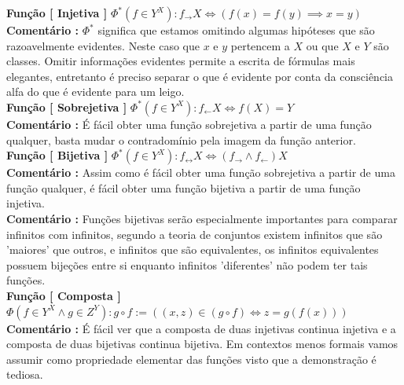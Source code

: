 \documentclass[10pt,a4paper]{report}
\begin{document}

\textbf{Função [ Injetiva ]} $ \Phi^*( f \in Y^X ) : f_{\rightarrow} X \iff ( f(x) = f(y) \implies x = y ) $\\

\textbf{Comentário :} $\Phi^*$ significa que estamos omitindo algumas hipóteses que são razoavelmente evidentes. Neste caso que $x$ e $y$ pertencem a $X$ ou que $X$ e $Y$ são classes. Omitir informações evidentes permite a escrita de fórmulas mais elegantes, entretanto é preciso separar o que é evidente por conta da consciência alfa do que é evidente para um leigo.\\

\textbf{Função [ Sobrejetiva ]} $ \Phi^*( f \in Y^X ) : f_{\leftarrow} X \iff f(X) = Y $\\

\textbf{Comentário :} É fácil obter uma função sobrejetiva a partir de uma função qualquer, basta mudar o contradomínio pela imagem da função anterior.\\

\textbf{Função [ Bijetiva ]} $ \Phi^*( f \in Y^X ) : f_{\leftrightarrow}X \iff ( f_{\rightarrow} \wedge f_{\leftarrow}  )X $\\

\textbf{Comentário :} Assim como é fácil obter uma função sobrejetiva a partir de uma função qualquer, é fácil obter uma função bijetiva a partir de uma função injetiva.\\

\textbf{Comentário :} Funções bijetivas serão especialmente importantes para comparar infinitos com infinitos, segundo a teoria de conjuntos existem infinitos que são 'maiores' que outros, e infinitos que são equivalentes, os infinitos equivalentes possuem bijeções entre si enquanto infinitos 'diferentes' não podem ter tais funções.\\

\textbf{Função [ Composta ]} $ \Phi( f \in Y^X \wedge g \in Z^Y ) : g \circ f := ( (x,z) \in (g \circ f) \iff z = g( f(x) ) ) $\\

\textbf{Comentário :} É fácil ver que a composta de duas injetivas continua injetiva e a composta de duas bijetivas continua bijetiva. Em contextos menos formais vamos assumir como propriedade elementar das funções visto que a demonstração é tediosa.
\end{document}
